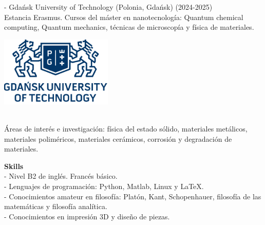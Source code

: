 \documentclass{report}
\begin{document}
{\vspace{.4cm}
\begin{minipage}{0.7\textwidth} 
- Gdańsk University of Technology (Polonia, Gdańsk) (2024-2025)\\
Estancia Erasmus. Cursos del máster en nanotecnología: Quantum chemical computing, Quantum mechanics, técnicas de microscopía y física de materiales.\\
\end{minipage}
\begin{minipage}{0.3\textwidth}
\raggedleft
\includegraphics[width=0.4\textwidth]{pg.png}
\end{minipage}\\

\vspace{.4cm}
Áreas de interés e investigación: física del estado sólido, materiales metálicos, materiales poliméricos, materiales cerámicos, corrosión y degradación de materiales.\\
\vspace{.1cm}

\textbf{Skills}\\

\noindent
- Nivel B2 de inglés. Francés básico.\\
- Lenguajes de programación: Python, Matlab, Linux y LaTeX.\\
- Conocimientos amateur en filosofía: Platón, Kant, Schopenhauer, filosofía de las matemáticas y filosofía analítica.\\
- Conocimientos en impresión 3D y diseño de piezas.\\
}
\newpage
\end{document}
